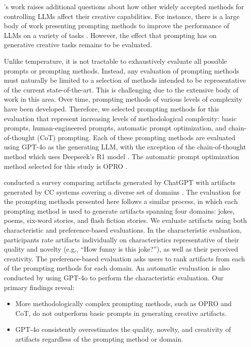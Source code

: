 \documentclass[phd,electronic,oneside,twosidetoc,letterpaper,chaptercenter,parttop,lof]{byumsphd}
\begin{document}
\citeauthor{peeperkorn2024temperature}'s work raises additional questions about how other widely accepted methods for controlling LLMs affect their creative capabilities. For instance, there is a large body of work presenting prompting methods to improve the performance of LLMs on a variety of tasks \cite{brown2020gpt3,liu2023prompt}. However, the effect that prompting has on generative creative tasks remains to be evaluated. 

Unlike temperature, it is not tractable to exhaustively evaluate all possible prompts or prompting methods. Instead, any evaluation of prompting methods must naturally be limited to a selection of methods intended to be representative of the current state-of-the-art. This is challenging due to the extensive body of work in this area. Over time, prompting methods of various levels of complexity have been developed. Therefore, we selected prompting methods for this evaluation that represent increasing levels of methodological complexity: basic prompts, human-engineered prompts, automatic prompt optimization, and chain-of-thought (CoT) prompting. Each of these prompting methods are evaluated using GPT-4o \cite{gpt-4o} as the generating LLM, with the exception of the chain-of-thought method which uses Deepseek's R1 model \cite{deepseek2025r1}. The automatic prompt optimization method selected for this study is OPRO \cite{yang2024opro}.

\citeauthor{morain2023language} conducted a survey comparing artifacts generated by ChatGPT with artifacts generated by CC systems covering a diverse set of domains \cite{morain2023language}. The evaluation for the prompting methods presented here follows a similar process, in which each prompting method is used to generate artifacts spanning four domains: jokes, poems, six-word stories, and flash fiction stories. We evaluate artifacts using both characteristic and preference-based evaluations. In the characteristic evaluation, participants rate artifacts individually on characteristics representative of their quality and novelty (e.g., “How funny is this joke?”), as well as their perceived creativity. The preference-based evaluation asks users to rank artifacts from each of the prompting methods for each domain. An automatic evaluation is also conducted by using GPT-4o to perform the characteristic evaluation. Our primary findings reveal:

\begin{itemize}
    \item More methodologically complex prompting methods, such as OPRO and CoT, do not outperform basic prompts in generating creative artifacts.
    \item GPT-4o consistently overestimates the quality, novelty, and creativity of artifacts regardless of the prompting method or domain.
\end{itemize}
\end{document}
